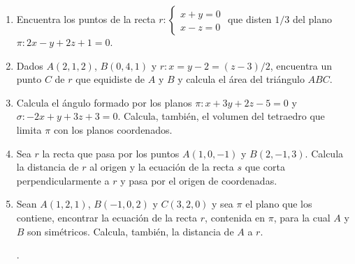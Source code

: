 \begin{enumerate}
\vspace{2mm} 

\item Encuentra los puntos de la recta $r:\begin{cases}x+y=0\\x-z=0\end{cases}$ que disten $1/3$ del plano $\pi:2x-y+2z+1=0$.

\vspace{2mm} 

\item Dados $A(2,1,2)$, $B(0,4,1)$ y $r:x=y-2=(z-3)/2$, encuentra un punto $C$ de $r$ que equidiste de $A$ y $B$ y calcula el área del triángulo $ABC$.

\vspace{2mm} 

\item Calcula el ángulo formado por los planos $\pi: x+3y+2z-5=0$ y $\sigma:-2x+y+3z+3=0$. Calcula, también, el volumen del tetraedro que limita $\pi$ con los planos coordenados.

\vspace{2mm} 

\item Sea $r$ la recta que pasa por los puntos $A(1,0,-1)$ y $B(2,-1,3)$. Calcula la distancia de $r$ al origen y la ecuación de la recta $s$ que corta perpendicularmente a $r$ y pasa por el origen de coordenadas.

\vspace{2mm} 

\item Sean $A(1,2,1)$, $B(-1,0,2)$ y $C(3,2,0)$ y sea $\pi$ el plano que los contiene, encontrar la ecuación de la recta $r$, contenida en $\pi$, para la cual $A$ y $B$ son simétricos. Calcula, también, la distancia de $A$ a $r$.

.


\end{enumerate}
